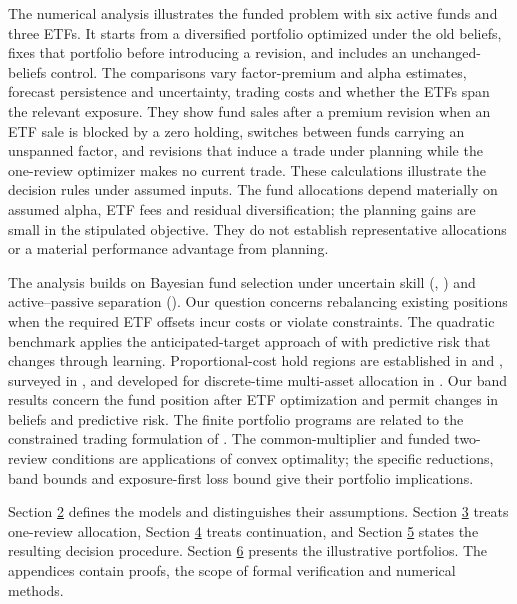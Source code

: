 \documentclass[11pt]{article}
\begin{document}
The numerical analysis illustrates the funded problem with six active funds and three ETFs. It starts from a diversified portfolio optimized under the old beliefs, fixes that portfolio before introducing a revision, and includes an unchanged-beliefs control. The comparisons vary factor-premium and alpha estimates, forecast persistence and uncertainty, trading costs and whether the ETFs span the relevant exposure. They show fund sales after a premium revision when an ETF sale is blocked by a zero holding, switches between funds carrying an unspanned factor, and revisions that induce a trade under planning while the one-review optimizer makes no current trade. These calculations illustrate the decision rules under assumed inputs. The fund allocations depend materially on assumed alpha, ETF fees and residual diversification; the planning gains are small in the stipulated objective. They do not establish representative allocations or a material performance advantage from planning.

The analysis builds on Bayesian fund selection under uncertain skill (\cite{baks2001should}, \cite{pastor2002investing}) and active--passive separation (\cite{treynor1973security}). Our question concerns rebalancing existing positions when the required ETF offsets incur costs or violate constraints. The quadratic benchmark applies the anticipated-target approach of \cite{garleanu2013dynamic} with predictive risk that changes through learning. Proportional-cost hold regions are established in \cite{constantinides1986capital} and \cite{davis1990portfolio}, surveyed in \cite{muhlekarbe2017primer}, and developed for discrete-time multi-asset allocation in \cite{mei2016multiperiod}. Our band results concern the fund position after ETF optimization and permit changes in beliefs and predictive risk. The finite portfolio programs are related to the constrained trading formulation of \cite{boyd2017multiperiod}. The common-multiplier and funded two-review conditions are applications of convex optimality; the specific reductions, band bounds and exposure-first loss bound give their portfolio implications.

Section \hyperref[sec:2]{2} defines the models and distinguishes their assumptions. Section \hyperref[sec:3]{3} treats one-review allocation, Section \hyperref[sec:4]{4} treats continuation, and Section \hyperref[sec:5]{5} states the resulting decision procedure. Section \hyperref[sec:6]{6} presents the illustrative portfolios. The appendices contain proofs, the scope of formal verification and numerical methods.
\end{document}
